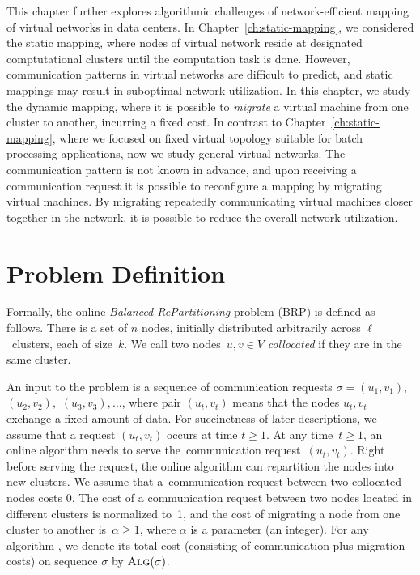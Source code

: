 This chapter further explores algorithmic challenges of network-efficient mapping of virtual networks in data centers.
In Chapter~\ref{ch:static-mapping}, we considered the static mapping, where nodes of virtual network reside at designated comptutational clusters until the computation task is done.
However, communication patterns in virtual networks are difficult to predict, and static mappings may result in suboptimal network utilization.
In this chapter, we study the dynamic mapping, where it is possible to \emph{migrate} a virtual machine from one cluster to another, incurring a fixed cost.
In contrast to Chapter~\ref{ch:static-mapping}, where we focused on fixed virtual topology suitable for batch processing applications, now we study general virtual networks.
The communication pattern is not known in advance, and upon receiving a communication request it is possible to reconfigure a mapping by migrating virtual machines.
By migrating repeatedly communicating virtual machines closer together in the network, it is possible to reduce the overall network utilization.

\section{Problem Definition}


Formally, the online \emph{Balanced RePartitioning} problem (BRP) is defined as
follows. There is a set of $n$ nodes, initially distributed arbitrarily
across $\ell$~clusters, each of size~$k$. We call two nodes~$u,v\in V$
\emph{collocated} if they are in the same cluster.

An input to the problem is a sequence of communication requests $\sigma =
(u_1,v_1),$ $(u_2,v_2),$ $(u_3,v_3), \ldots$, where pair $(u_t,v_t)$ means that
the nodes $u_t,v_t$ exchange a fixed amount of data. For succinctness of later descriptions,
we assume that a request $(u_t,v_t)$ occurs at time $t \geq 1$. At any time~$t
\geq 1$, an online algorithm needs to serve the~communication
request~$(u_t,v_t)$. Right before serving the request, the online algorithm
can \emph{re}partition the nodes into new clusters. We assume that
a~communication request between two collocated nodes costs 0. The cost of a
communication request between two nodes located in different clusters is
normalized to~1, and the cost of migrating a node from one cluster to another
is~$\alpha \geq 1$, where $\alpha$ is a parameter (an integer). For any
algorithm \ALG, we denote its total cost (consisting of communication plus
migration costs) on sequence $\sigma$ by $\textsc{Alg}(\sigma)$.

